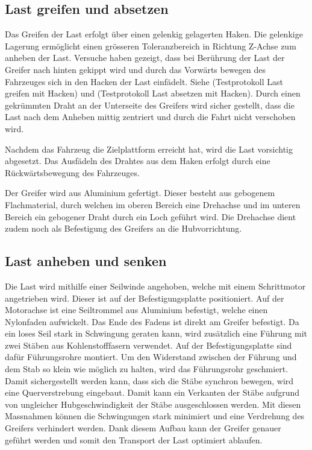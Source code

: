 \documentclass[a4paper]{report}
\begin{document}
\newpage

\subsection{Last greifen und absetzen}

Das Greifen der Last erfolgt über einen gelenkig gelagerten Haken. Die gelenkige Lagerung ermöglicht einen grösseren Toleranzbereich in Richtung Z-Achse zum anheben der Last. Versuche haben gezeigt, dass bei Berührung der Last der Greifer nach hinten gekippt wird und durch das Vorwärts bewegen des Fahrzeuges sich in den Hacken der Last einfädelt. Siehe (Testprotokoll Last greifen mit Hacken) und (Testprotokoll Last absetzen mit Hacken). Durch einen gekrümmten Draht an der Unterseite des Greifers wird sicher gestellt, dass die Last nach dem Anheben mittig zentriert und durch die Fahrt nicht verschoben wird.

Nachdem das Fahrzeug die Zielplattform erreicht hat, wird die Last vorsichtig abgesetzt. Das Ausfädeln des Drahtes aus dem Haken erfolgt durch eine Rückwärtsbewegung des Fahrzeuges.

Der Greifer wird aus Aluminium gefertigt. Dieser besteht aus gebogenem Flachmaterial, durch welchen im oberen Bereich eine Drehachse und im unteren Bereich ein gebogener Draht durch ein Loch geführt wird. Die Drehachse dient zudem noch als Befestigung des Greifers an die Hubvorrichtung.

\subsection{Last anheben und senken}
Die Last wird mithilfe einer Seilwinde angehoben, welche mit einem Schrittmotor angetrieben wird. Dieser ist auf der Befestigungsplatte positioniert. Auf der Motorachse ist eine Seiltrommel aus Aluminium befestigt, welche einen Nylonfaden aufwickelt. Das Ende des Fadens ist direkt am Greifer befestigt. Da ein loses Seil stark in Schwingung geraten kann, wird zusätzlich eine Führung mit zwei Stäben aus Kohlenstofffasern verwendet. Auf der Befestigungsplatte sind dafür Führungsrohre montiert. Um den Widerstand zwischen der Führung und dem Stab so klein wie möglich zu halten, wird das Führungsrohr geschmiert. Damit sichergestellt werden kann, dass sich die Stäbe synchron bewegen, wird eine Querverstrebung eingebaut. Damit kann ein Verkanten der Stäbe aufgrund von ungleicher Hubgeschwindigkeit der Stäbe ausgeschlossen werden. Mit diesen Massnahmen können die Schwingungen stark minimiert und eine Verdrehung des Greifers verhindert werden. Dank diesem Aufbau kann der Greifer genauer geführt werden und somit den Transport der Last optimiert ablaufen.
\end{document}
